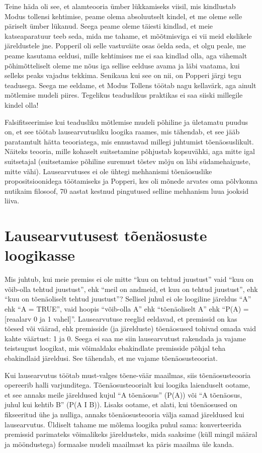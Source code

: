\documentclass[]{book}
\begin{document}
Teine häda oli see, et alamteooria ümber lükkamiseks viisil, mis
kindlustab Modus tollensi kehtimise, peame olema absoluutselt kindel, et
me oleme selle päriselt ümber lükanud. Seega peame oleme täiesti
kindlad, et meie katseaparatuur teeb seda, mida me tahame, et
mõõtmisviga ei vii meid ekslikele järeldustele jne. Popperil oli selle
vastuväite osas öelda seda, et olgu peale, me peame kasutama eeldusi,
mille kehtimises me ei saa kindlad olla, aga vähemalt põhimõtteliselt
oleme me nõus iga sellise eelduse avama ja läbi vaatama, kui selleks
peaks vajadus tekkima. Senikaua kui see on nii, on Popperi järgi tegu
teadusega. Seega me eeldame, et Modus Tollens töötab nagu kellavärk, aga
ainult mõtlemise mudeli piires. Tegelikus teaduslikus praktikas ei saa
siiski millegile kindel olla!

Falsifitseerimise kui teadusliku mõtlemise mudeli põhiline ja ületamatu
puudus on, et see töötab lausearvutusliku loogika raames, mis tähendab,
et see jääb paratamtult hätta teooriatega, mis ennustavad millegi
juhtumist tõenäosuslikult. Näiteks teooria, mille kohaselt suitsetamine
põhjustab kopsuvähki, aga mitte igal suitsetajal (suitsetamise põhiline
suremust tõstev mõju on läbi südamehaiguste, mitte vähi). Lausearvutuses
ei ole ühtegi mehhanismi tõenäosuslike propositsioonidega töötamiseks ja
Popperi, kes oli mõnede arvates oma põlvkonna nutikaim filosoof, 70
aastat kestnud pingutused selline mehhanism luua jooksid liiva.

\section{Lausearvutusest tõenäosuste
loogikasse}\label{lausearvutusest-toenaosuste-loogikasse}

Mis juhtub, kui meie premiss ei ole mitte ``kuu on tehtud juustust''
vaid ``kuu on võib-olla tehtud juustust'', ehk ``meil on andmeid, et kuu
on tehtud juustust'', ehk ``kuu on tõenäoliselt tehtud juustust''?
Sellisel juhul ei ole loogiline järeldus ``A'' ehk ``A = TRUE'', vaid
hoopis ``võib-olla A'' ehk ``tõenäoliselt A'' ehk ``P(A) = {[}reaalarv 0
ja 1 vahel{]}''. Lausearvutuse reeglid eeldavad, et premissid on kas
tõesed või väärad, ehk premisside (ja järelduste) tõenäosused tohivad
omada vaid kahte väärtust: 1 ja 0. Seega ei saa me siin lausearvutust
rakendada ja vajame teistsugust loogikat, mis võimaldaks ebakindlate
premisside põhjal teha ebakindlaid järeldusi. See tähendab, et me vajame
tõenäosusteooriat.

Kui lausearvutus töötab must-valges tõene-väär maailmas, siis
tõenäosusteooria opereerib halli varjunditega. Tõenäosusteoorialt kui
loogika laienduselt ootame, et see annaks meile järeldused kujul ``A
tõenäosus'' (P(A)) või ``A tõenäosus, juhul kui kehtib B'' (P(A I B)).
Lisaks ootame, et alati, kui tõenäosused on fikseeritud ühe ja nulliga,
annaks tõenäosusteooria välja samad järeldused kui lausearvutus.
Üldiselt tahame me mõlema loogika puhul sama: konverteerida premissid
parimateks võimalikeks järeldusteks, mida saaksime (küll mingil määral
ja mööndustega) formaalse mudeli maailmast ka päris maailma üle kanda.
\end{document}
